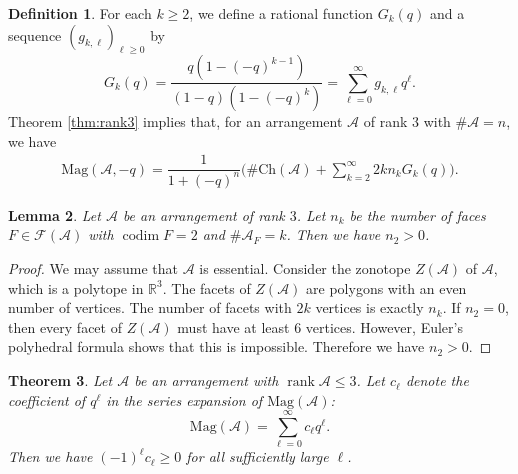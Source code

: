 \documentclass{amsart}
\numberwithin{equation}{section}
\newtheorem{thm}{Theorem}[section]
\theoremstyle{plain}
\newtheorem{lem}[thm]{Lemma}
\theoremstyle{remark}
\theoremstyle{definition}
\newtheorem{defn}[thm]{Definition}
\numberwithin{equation}{section}
\newcommand{\A}{\mathcal{A}}
\newcommand{\FF}{\mathcal{F}}
\newcommand{\R}{\mathbb{R}}
\newcommand{\Mag}{\mathrm{Mag}}
\newcommand{\Ch}{\mathrm{Ch}}
\DeclareMathOperator{\rank}{rank}
\DeclareMathOperator{\codim}{codim}
\begin{document}
\begin{defn}
    For each $k\geq 2$, we define a rational function $G_k(q)$ and a sequence $(g_{k,\ell})_{\ell\geq 0}$ by
    \[
    G_k(q)=\dfrac{q(1-(-q)^{k-1})}{(1-q)(1-(-q)^k)}=\sum_{\ell=0}^\infty g_{k,\ell}q^\ell.
    \]
    Theorem \ref{thm:rank3} implies that, for an arrangement $\A$ of rank $3$ with $\#\A=n$, we have
    \begin{align}\label{mag_minus_q}
    \Mag(\A,-q)=\dfrac{1}{1+(-q)^n}\biggl(\#\Ch(\A)+\sum_{k=2}^\infty 2kn_kG_k(q)\biggr).
    \end{align}
\end{defn}

\begin{lem}\label{n2positive}
    Let $\A$ be an arrangement of rank $3$.
    Let $n_k$ be the number of faces $F\in \FF(\A)$ with $\codim F=2$ and $\#\A_F=k$.
    Then we have $n_2>0$.
\end{lem}

\begin{proof}
    We may assume that $\A$ is essential.
    Consider the zonotope $Z(\A)$ of $\A$, which is a polytope in $\R^3$.
    The facets of $Z(\A)$ are polygons with an even number of vertices.
    The number of facets with $2k$ vertices is exactly $n_k$.
    If $n_2=0$, then every facet of $Z(\A)$ must have at least $6$ vertices.
    However, Euler's polyhedral formula shows that this is impossible.
    Therefore we have $n_2>0$.
\end{proof}

\begin{thm}\label{alternating}
    Let $\A$ be an arrangement with $\rank \A\leq 3$.
    Let $c_\ell$ denote the coefficient of $q^\ell$ in the series expansion of $\Mag(\A)$:
    \[
    \Mag(\A)=\sum_{\ell=0}^\infty c_\ell q^\ell.
    \]
    Then we have $(-1)^\ell c_\ell\geq 0$ for all sufficiently large $\ell$.
\end{thm}
\end{document}
